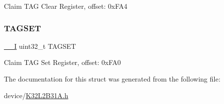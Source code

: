 Claim T\+AG Clear Register, offset\+: 0x\+F\+A4 \mbox{\label{struct_m_t_b___type_a5a64f3efc24eb45f8629ddc8050071d0}} 
\subsubsection{\texorpdfstring{TAGSET}{TAGSET}}
{\footnotesize\ttfamily \mbox{\hyperlink{core__cm0plus_8h_af63697ed9952cc71e1225efe205f6cd3}{\+\_\+\+\_\+I}} uint32\+\_\+t T\+A\+G\+S\+ET}

Claim T\+AG Set Register, offset\+: 0x\+F\+A0 

The documentation for this struct was generated from the following file\+:\begin{DoxyCompactItemize}
\item 
device/\mbox{\hyperlink{_k32_l2_b31_a_8h}{K32\+L2\+B31\+A.\+h}}\end{DoxyCompactItemize}
